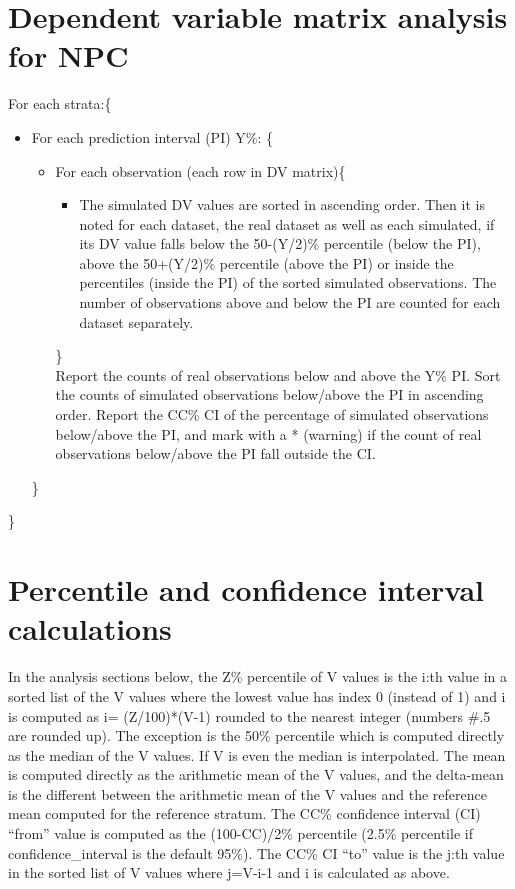 \section{Dependent variable matrix analysis for NPC}
For each strata:\{
\begin{itemize}
\item[] For each prediction interval (PI) Y\%: \{
\begin{itemize}
\item[] For each observation (each row in DV matrix)\{
\begin{itemize}
\item[] The simulated DV values are sorted in ascending order. Then it is noted for each dataset, the real dataset as well as each simulated, if its DV value falls below the 50-(Y/2)\% percentile (below the PI), above the 50+(Y/2)\% percentile (above the PI) or inside the percentiles (inside the PI) of the sorted simulated observations. The number of observations above and below the PI are counted for each dataset separately.
\end{itemize}
\}\\
Report the counts of real observations below and above the Y\% PI. Sort the counts of simulated observations below/above the PI in ascending order. Report the CC\% CI of the percentage of simulated observations below/above the PI, and mark with a * (warning) if the count of real observations below/above the PI fall outside the CI.
\end{itemize}
\}
\end{itemize}
\}
\section{Percentile and confidence interval calculations}
In the analysis sections below, the Z\% percentile of V values is the i:th value in a sorted list of the V values where the lowest value has index 0 (instead of 1) and i is computed as i= (Z/100)*(V-1) rounded to the nearest integer (numbers \#.5 are rounded up). The exception is the 50\% percentile which is computed directly as the median of the V values. If V is even the median is interpolated. The mean is computed directly as the arithmetic mean of the V values, and the delta-mean is the different between the arithmetic mean of the V values and the reference mean computed for the reference stratum.  The CC\% confidence interval (CI) “from” value is computed as the (100-CC)/2\% percentile (2.5\% percentile if confidence\_interval is the default 95\%). The CC\% CI “to” value is the j:th value in the sorted list of V values where j=V-i-1 and i is calculated as above.
